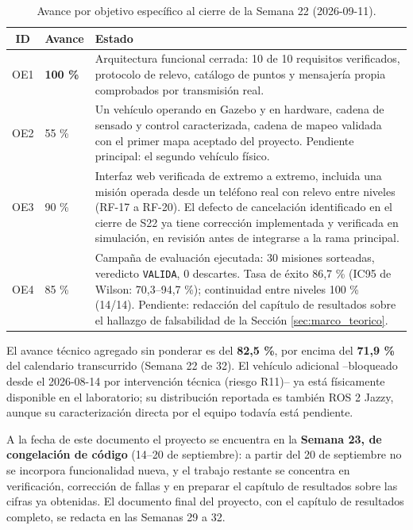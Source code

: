 \documentclass[12pt,letterpaper]{article}
\begin{document}
\begin{table}[H]
    \centering
    \small
    \caption{Avance por objetivo específico al cierre de la Semana 22 (2026-09-11).}
    \label{tab:avance_oe}
    \begin{tabular}{@{}cp{2.2cm}p{10.5cm}@{}}
        \toprule
        \textbf{ID} & \textbf{Avance} & \textbf{Estado} \\ \midrule
        OE1 & \textbf{100 \%} & Arquitectura funcional cerrada: 10 de 10 requisitos verificados, protocolo de relevo, catálogo de puntos y mensajería propia comprobados por transmisión real. \\ \addlinespace
        OE2 & 55 \% & Un vehículo operando en Gazebo y en hardware, cadena de sensado y control caracterizada, cadena de mapeo validada con el primer mapa aceptado del proyecto. Pendiente principal: el segundo vehículo físico. \\ \addlinespace
        OE3 & 90 \% & Interfaz web verificada de extremo a extremo, incluida una misión operada desde un teléfono real con relevo entre niveles (RF-17 a RF-20). El defecto de cancelación identificado en el cierre de S22 ya tiene corrección implementada y verificada en simulación, en revisión antes de integrarse a la rama principal. \\ \addlinespace
        OE4 & 85 \% & Campaña de evaluación ejecutada: 30 misiones sorteadas, veredicto \texttt{VALIDA}, 0 descartes. Tasa de éxito 86,7 \% (IC95 de Wilson: 70,3--94,7 \%); continuidad entre niveles 100 \% (14/14). Pendiente: redacción del capítulo de resultados sobre el hallazgo de falsabilidad de la Sección \ref{sec:marco_teorico}. \\ \bottomrule
    \end{tabular}
\end{table}

El avance técnico agregado sin ponderar es del \textbf{82,5 \%}, por encima del \textbf{71,9 \%} del calendario transcurrido (Semana 22 de 32). El vehículo adicional --bloqueado desde el 2026-08-14 por intervención técnica (riesgo R11)-- ya está físicamente disponible en el laboratorio; su distribución reportada es también ROS 2 Jazzy, aunque su caracterización directa por el equipo todavía está pendiente.

A la fecha de este documento el proyecto se encuentra en la \textbf{Semana 23, de congelación de código} (14--20 de septiembre): a partir del 20 de septiembre no se incorpora funcionalidad nueva, y el trabajo restante se concentra en verificación, corrección de fallas y en preparar el capítulo de resultados sobre las cifras ya obtenidas. El documento final del proyecto, con el capítulo de resultados completo, se redacta en las Semanas 29 a 32.
\end{document}
